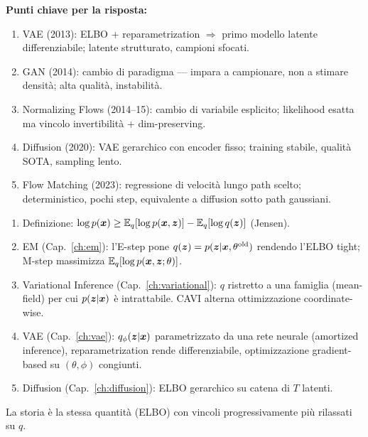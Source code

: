 \begin{tcolorbox}[mywarn, title={Famiglia generativa: traccia l'evoluzione dal VAE al Flow Matching}]
\textbf{Punti chiave per la risposta:}
\begin{enumerate}
  \item VAE (2013): ELBO + reparametrization $\Rightarrow$ primo modello latente differenziabile; latente strutturato, campioni sfocati.
  \item GAN (2014): cambio di paradigma — impara a campionare, non a stimare densità; alta qualità, instabilità.
  \item Normalizing Flows (2014--15): cambio di variabile esplicito; likelihood esatta ma vincolo invertibilità + dim-preserving.
  \item Diffusion (2020): VAE gerarchico con encoder fisso; training stabile, qualità SOTA, sampling lento.
  \item Flow Matching (2023): regressione di velocità lungo path scelto; deterministico, pochi step, equivalente a diffusion sotto path gaussiani.
\end{enumerate}
\end{tcolorbox}

\begin{tcolorbox}[mywarn, title={ELBO: come collega EM, Variational Inference e VAE?}]
\begin{enumerate}
  \item Definizione: $\log p(\bm{x}) \geq \mathbb{E}_q[\log p(\bm{x},\bm{z})] - \mathbb{E}_q[\log q(\bm{z})]$ (Jensen).
  \item EM (Cap.~\ref{ch:em}): l'E-step pone $q(\bm{z}) = p(\bm{z}|\bm{x},\theta^{\text{old}})$ rendendo l'ELBO tight; M-step massimizza $\mathbb{E}_q[\log p(\bm{x},\bm{z};\theta)]$.
  \item Variational Inference (Cap.~\ref{ch:variational}): $q$ ristretto a una famiglia (mean-field) per cui $p(\bm{z}|\bm{x})$ è intrattabile. CAVI alterna ottimizzazione coordinate-wise.
  \item VAE (Cap.~\ref{ch:vae}): $q_\phi(\bm{z}|\bm{x})$ parametrizzato da una rete neurale (amortized inference), reparametrization rende differenziabile, optimizzazione gradient-based su $(\theta,\phi)$ congiunti.
  \item Diffusion (Cap.~\ref{ch:diffusion}): ELBO gerarchico su catena di $T$ latenti.
\end{enumerate}
La storia è la stessa quantità (ELBO) con vincoli progressivamente più rilassati su $q$.
\end{tcolorbox}


